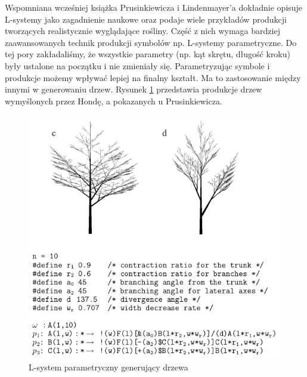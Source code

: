 \documentclass[inz,longabstract]{iithesis}
\begin{document}
            Wspomniana wcześniej książka Prusinkiewicza i Lindenmayer'a\cite{plants} dokładnie opisuje L-systemy jako zagadnienie naukowe oraz podaje wiele przykładów produkcji tworzących realistycznie wyglądające rośliny. Część z nich wymaga bardziej zaawansowanych technik produkcji symbolów np. L-systemy parametryczne. Do tej pory zakładaliśmy, że wszystkie parametry (np. kąt skrętu, długość kroku) były ustalone na początku i nie zmieniały się. Parametryzując symbole i produkcje możemy wpływać lepiej na finalny kształt. Ma to zastosowanie między innymi w generowaniu drzew. Rysunek \ref{fig:hondaTrees} przedstawia produkcje drzew wymyślonych przez Hondę\cite{honda}, a pokazanych u Prusinkiewicza\cite{plants}.
            \begin{figure}[H]
                \includegraphics[width=\linewidth]{hondaTrees.png}
                \caption{L-system parametryczny generujący drzewa \cite{plants}\cite{honda}} 
                \label{fig:hondaTrees}
            \end{figure}
            
\end{document}
